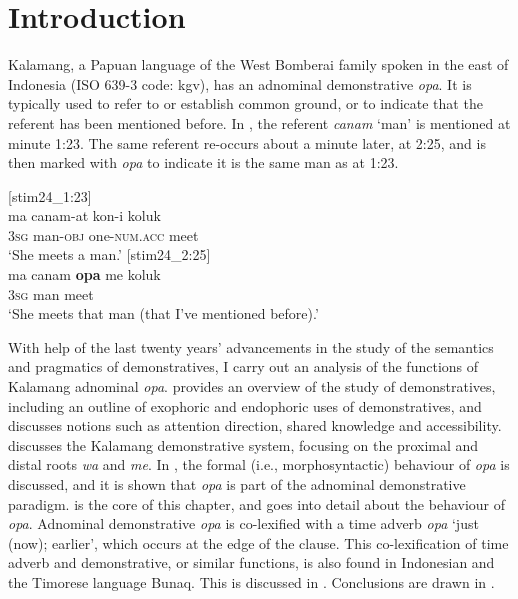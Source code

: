 \documentclass[output=paper,colorlinks,citecolor=brown]{langscibook}
\author{Eline Visser\affiliation{Lund University}}
\begin{document}
\maketitle
{}

\section{Introduction}
Kalamang, a Papuan language of the West Bomberai family spoken in the east of Indonesia (ISO 639-3 code: kgv), has an adnominal demonstrative \textit{opa}. It is typically used to refer to or establish common ground, or to indicate that the referent has been mentioned before. In , the referent \textit{canam} `man' is mentioned at minute 1:23. The same referent re-occurs about a minute later, at 2:25, and is then marked with \textit{opa} to indicate it is the same man as at 1:23.

\ea\label{exe:canam}
	\ea\label{exe:canamat}[stim24\_1:23]\\
	\gll ma 	canam-at kon-i 		koluk \\
	\textsc{3sg} 	man-\textsc{obj} one-\textsc{num.acc}	meet \\
	\glt	`She meets a man.' 
	\ex\label{exe:canamopac}[stim24\_2:25]\\
	\gll ma 	canam 	\textbf{opa} 	me 		koluk \\
	\textsc{3sg} 	man 		{\glopa} 	{\glme} 	meet \\
	\glt	`She meets that man (that I've mentioned before).'
	\z
	\z
	
With help of the last twenty years' advancements in the study of the semantics and pragmatics of demonstratives, I carry out an analysis of the functions of Kalamang adnominal \textit{opa}.  provides an overview of the study of demonstratives, including an outline of exophoric and endophoric uses of demonstratives, and discusses notions such as attention direction, shared knowledge and accessibility.  discusses the Kalamang demonstrative system, focusing on the proximal and distal roots \textit{wa} and \textit{me}. In , the formal (i.e., morphosyntactic) behaviour of \textit{opa} is discussed, and it is shown that \textit{opa} is part of the adnominal demonstrative paradigm.  is the core of this chapter, and goes into detail about the behaviour of \textit{opa}. Adnominal demonstrative \textit{opa} is co-lexified with a time adverb \textit{opa} `just (now); earlier', which occurs at the edge of the clause. This co-lexification of time adverb and demonstrative, or similar functions, is also found in Indonesian and the Timorese language Bunaq. This is discussed in . Conclusions are drawn in .
\end{document}
